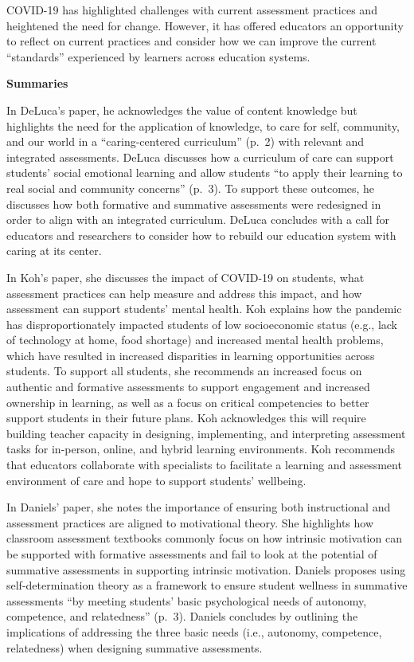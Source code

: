 \documentclass[
]{book}
\begin{document}
COVID-19 has highlighted challenges with current assessment practices and heightened the need for change. However, it has offered educators an opportunity to reflect on current practices and consider how we can improve the current ``standards'' experienced by learners across education systems.

\textbf{Summaries}

In DeLuca's paper, he acknowledges the value of content knowledge but highlights the need for the application of knowledge, to care for self, community, and our world in a ``caring-centered curriculum'' (p.~2) with relevant and integrated assessments. DeLuca discusses how a curriculum of care can support students' social emotional learning and allow students ``to apply their learning to real social and community concerns'' (p.~3). To support these outcomes, he discusses how both formative and summative assessments were redesigned in order to align with an integrated curriculum. DeLuca concludes with a call for educators and researchers to consider how to rebuild our education system with caring at its center.

In Koh's paper, she discusses the impact of COVID-19 on students, what assessment practices can help measure and address this impact, and how assessment can support students' mental health. Koh explains how the pandemic has disproportionately impacted students of low socioeconomic status (e.g., lack of technology at home, food shortage) and increased mental health problems, which have resulted in increased disparities in learning opportunities across students. To support all students, she recommends an increased focus on authentic and formative assessments to support engagement and increased ownership in learning, as well as a focus on critical competencies to better support students in their future plans. Koh acknowledges this will require building teacher capacity in designing, implementing, and interpreting assessment tasks for in-person, online, and hybrid learning environments. Koh recommends that educators collaborate with specialists to facilitate a learning and assessment environment of care and hope to support students' wellbeing.

In Daniels' paper, she notes the importance of ensuring both instructional and assessment practices are aligned to motivational theory. She highlights how classroom assessment textbooks commonly focus on how intrinsic motivation can be supported with formative assessments and fail to look at the potential of summative assessments in supporting intrinsic motivation. Daniels proposes using self-determination theory as a framework to ensure student wellness in summative assessments ``by meeting students' basic psychological needs of autonomy, competence, and relatedness'' (p.~3). Daniels concludes by outlining the implications of addressing the three basic needs (i.e., autonomy, competence, relatedness) when designing summative assessments.
\end{document}

